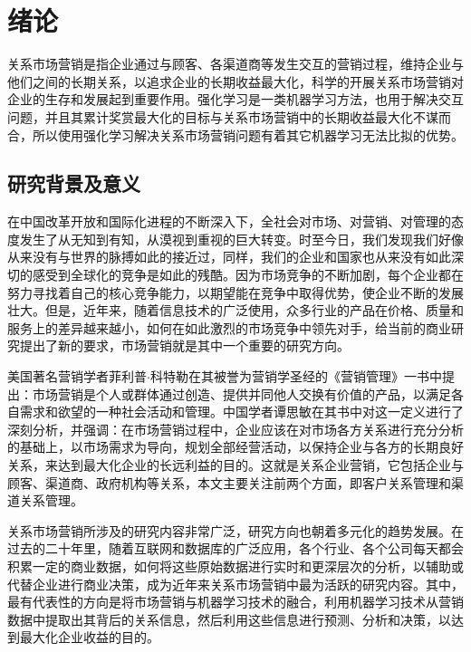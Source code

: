\chapter{绪论}
 关系市场营销是指企业通过与顾客、各渠道商等发生交互的营销过程，维持企业与他们之间的长期关系，以追求企业的长期收益最大化，科学的开展关系市场营销对企业的生存和发展起到重要作用。强化学习是一类机器学习方法，也用于解决交互问题，并且其累计奖赏最大化的目标与关系市场营销中的长期收益最大化不谋而合，所以使用强化学习解决关系市场营销问题有着其它机器学习无法比拟的优势。

\section{研究背景及意义}


在中国改革开放和国际化进程的不断深入下，全社会对市场、对营销、对管理的态度发生了从无知到有知，从漠视到重视的巨大转变。时至今日，我们发现我们好像从来没有与世界的脉搏如此的接近过，同样，我们的企业和国家也从来没有如此深切的感受到全球化的竞争是如此的残酷。因为市场竞争的不断加剧，每个企业都在努力寻找着自己的核心竞争能力，以期望能在竞争中取得优势，使企业不断的发展壮大。但是，近年来，随着信息技术的广泛使用，众多行业的产品在价格、质量和服务上的差异越来越小，如何在如此激烈的市场竞争中领先对手，给当前的商业研究提出了新的要求，市场营销就是其中一个重要的研究方向。

美国著名营销学者菲利普$\cdot$科特勒在其被誉为营销学圣经的《营销管理》一书\citep{菲利普2016营销管理}中提出：市场营销是个人或群体通过创造、提供并同他人交换有价值的产品，以满足各自需求和欲望的一种社会活动和管理。中国学者谭思敏在其书\citep{谭思敏2008中国式营销}中对这一定义进行了深刻分析，并强调：在市场营销过程中，企业应该在对市场各方关系进行充分分析的基础上，以市场需求为导向，规划全部经营活动，以保持企业与各方的长期良好关系，来达到最大化企业的长远利益的目的。这就是关系企业营销，它包括企业与顾客、渠道商、政府机构等关系，本文主要关注前两个方面，即客户关系管理和渠道关系管理。

关系市场营销所涉及的研究内容非常广泛，研究方向也朝着多元化的趋势发展\citep{王广宇2013客户关系管理}。在过去的二十年里，随着互联网和数据库的广泛应用，各个行业、各个公司每天都会积累一定的商业数据，如何将这些原始数据进行实时和更深层次的分析，以辅助或代替企业进行商业决策，成为近年来关系市场营销中最为活跃的研究内容。其中，最有代表性的方向是将市场营销与机器学习技术的融合，利用机器学习技术从营销数据中提取出其背后的关系信息，然后利用这些信息进行预测、分析和决策，以达到最大化企业收益的目的。

